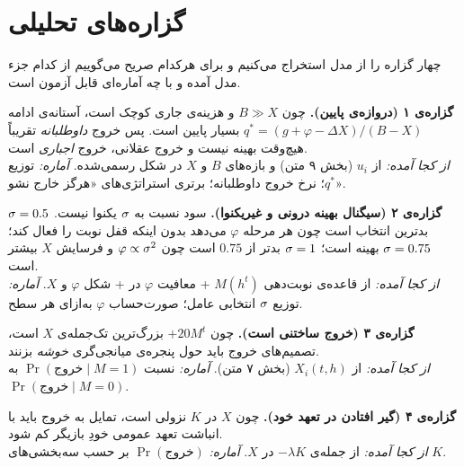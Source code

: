\documentclass[12pt,a4paper]{article}
\begin{document}
\section{گزاره‌های تحلیلی}\label{sec:props-stated}

چهار گزاره را از مدل استخراج می‌کنیم و برای هرکدام صریح می‌گوییم از کدام جزء
مدل آمده و با چه آماره‌ای قابل آزمون است.

\begin{keybox}
\textbf{گزاره‌ی ۱ (دروازه‌ی پایین).}
چون $B\gg X$ و هزینه‌ی جاری کوچک است، آستانه‌ی ادامه
$q^\ast=(g+\varphi-\Delta X)/(B-X)$ بسیار پایین است. پس خروج
\emph{داوطلبانه} تقریباً هیچ‌وقت بهینه نیست و خروج عقلانی، خروج \emph{اجباری}
است.\\[3pt]
\emph{از کجا آمده:} از $u_i$ (بخش ۹ متن) و بازه‌های $B$ و $X$ در شکل
رسمی‌شده.\quad
\emph{آماره:} توزیع $q^\ast$؛ نرخ خروج داوطلبانه؛ برتری استراتژی‌های
«هرگز خارج نشو».
\end{keybox}

\begin{keybox}
\textbf{گزاره‌ی ۲ (سیگنال بهینه درونی و غیریکنوا).}
سود نسبت به $\sigma$ یکنوا نیست. $\sigma=0.5$ بدترین انتخاب است چون هر مرحله
$\varphi$ می‌دهد بدون اینکه قفل نوبت را فعال کند؛ $\sigma=0.75$ بهینه است؛
$\sigma=1$ بدتر از $0.75$ است چون $\varphi\propto\sigma^2$ و فرسایش $X$ بیشتر
است.\\[3pt]
\emph{از کجا آمده:} از قاعده‌ی نوبت‌دهی $M(h^t)$ + معافیت $\varphi$ در
 + شکل $\varphi$ و $X$.\quad
\emph{آماره:} توزیع $\sigma$ انتخابی عامل؛ صورت‌حساب $\varphi$ به‌ازای هر سطح.
\end{keybox}

\begin{keybox}
\textbf{گزاره‌ی ۳ (خروج ساختنی است).}
چون $+20M^t$ بزرگ‌ترین تک‌جمله‌ی $X$ است، تصمیم‌های خروج باید حول پنجره‌ی
میانجی‌گری \emph{خوشه} بزنند.\\[3pt]
\emph{از کجا آمده:} از $X_i(t,h)$ (بخش ۷ متن).\quad
\emph{آماره:} نسبت $\Pr(\text{خروج}\mid M=1)$ به $\Pr(\text{خروج}\mid M=0)$.
\end{keybox}

\begin{keybox}
\textbf{گزاره‌ی ۴ (گیر افتادن در تعهد خود).}
چون $X$ در $K$ نزولی است، تمایل به خروج باید با انباشت تعهد عمومی خودِ
بازیگر کم شود.\\[3pt]
\emph{از کجا آمده:} از جمله‌ی $-\lambda K$ در $X$.\quad
\emph{آماره:} $\Pr(\text{خروج})$ بر حسب سه‌بخشی‌های $K$.
\end{keybox}
\end{document}
